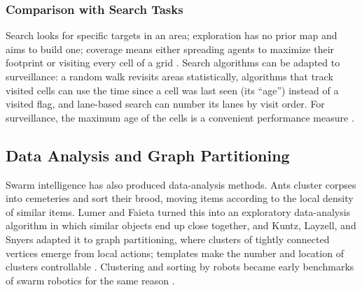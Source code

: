 \subsubsection{Comparison with Search Tasks}

Search looks for specific targets in an area; exploration has no prior map and
aims to build one; coverage means either spreading agents to maximize their
footprint or visiting every cell of a grid \cite{garcia2018comparison}. Search
algorithms can be adapted to surveillance: a random walk revisits areas
statistically, algorithms that track visited cells can use the time since a cell
was last seen (its ``age'') instead of a visited flag, and lane-based search can
number its lanes by visit order. For surveillance, the maximum age of the cells
is a convenient performance measure \cite{garcia2018comparison}.

\subsection{Data Analysis and Graph Partitioning}

Swarm intelligence has also produced data-analysis methods. Ants cluster corpses
into cemeteries and sort their brood, moving items according to the local density
of similar items. Lumer and Faieta turned this into an exploratory data-analysis
algorithm in which similar objects end up close together, and Kuntz, Layzell,
and Snyers adapted it to graph partitioning, where clusters of tightly connected
vertices emerge from local actions; templates make the number and location of
clusters controllable \cite{bonabeau1999swarm}. Clustering and sorting by robots
became early benchmarks of swarm robotics for the same reason
\cite{bonabeau1999swarm,hamann2018swarm}.

